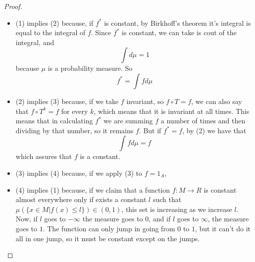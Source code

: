 \begin{proof}
	\begin{itemize}
		\item (1) implies (2) because, if $f^*$ is constant, by Birkhoff's theorem it's integral is equal to the integral of $f$. Since $f^*$ is constant, we can take is cout of the integral, and 
			$$
				\int d\mu = 1
			$$
			because $\mu$ is a probability measure. So
			$$
				f^* = \int f d\mu
			$$
		\item (2) implies (3) because, if we take $f$ invariant, so $f\circ T = f$, we can also say that $f\circ T^k = f$ for every $k$, which means that it is invariant at all times. This means that in calculating $f^*$ we are summing $f$ a number of times and then dividing by that number, so it remains $f$. But if $f^* = f$, by (2) we have that
			$$
				\int f d\mu = f
			$$
			which assures that $f$ is a constant.
		\item (3) implies (4) because, if we apply (3) to $f=1_A$, 
		\item (4) implies (1) because, if we claim that a function $f:M \rightarrow R$ is constant almost everywhere only if exists a constant $l$ such that $\mu(\{x\in M | f(x) \leq l\})\in (0,1)$, this set is increasing as we increase $l$. Now, if $l$ goes to $-\infty$ the measure goes to $0$, and if $l$ goes to $\infty$, the measure goes to $1$. The function can only jump in going from $0$ to $1$, but it can't do it all in one jump, so it must be constant except on the jumps.
	\end{itemize}	
\end{proof}














